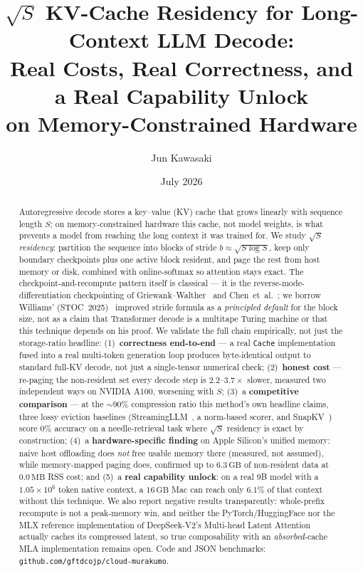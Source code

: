 \documentclass[11pt]{article}
\title{\textbf{$\sqrt{S}$ KV-Cache Residency for Long-Context LLM Decode:\\
Real Costs, Real Correctness, and a Real Capability Unlock\\
on Memory-Constrained Hardware}}
\author[1]{Jun Kawasaki}
\affil[1]{com-junkawasaki / etzhayyim / gftdcojp}
\date{July 2026}
\begin{document}
\maketitle

\begin{abstract}
Autoregressive decode stores a key--value (KV) cache that grows linearly
with sequence length $S$; on memory-constrained hardware this cache, not
model weights, is what prevents a model from reaching the long context it
was trained for. We study \emph{$\sqrt{S}$ residency}: partition the
sequence into blocks of stride $b\approx\sqrt{S\log S}$, keep only boundary
checkpoints plus one active block resident, and page the rest from host
memory or disk, combined with online-softmax so attention stays exact. The
checkpoint-and-recompute pattern itself is classical --- it is the
reverse-mode-differentiation checkpointing of
Griewank--Walther~\cite{griewank2000revolve} and
Chen~et~al.~\cite{chen2016checkpoint}; we borrow Williams'
(STOC~2025)~\cite{williams2025} improved stride formula as a
\emph{principled default} for the block size, not as a claim that
Transformer decode is a multitape Turing machine or that this technique
depends on his proof. We validate the full chain empirically, not just the
storage-ratio headline: (1)~\textbf{correctness end-to-end} --- a real
\texttt{Cache} implementation fused into a real multi-token generation loop
produces byte-identical output to standard full-KV decode, not just a
single-tensor numerical check; (2)~\textbf{honest cost} --- re-paging the
non-resident set every decode step is $2.2$--$3.7\times$ slower, measured
two independent ways on NVIDIA A100, worsening with $S$; (3)~a
\textbf{competitive comparison} --- at the $\sim\!90\%$ compression ratio
this method's own headline claims, three lossy eviction baselines
(StreamingLLM~\cite{xiao2023streamingllm}, a norm-based scorer, and
SnapKV~\cite{li2024snapkv}) score $0\%$ accuracy on a needle-retrieval task
where $\sqrt{S}$ residency is exact by construction; (4)~a
\textbf{hardware-specific finding} on Apple Silicon's unified memory: naive
host offloading does \emph{not} free usable memory there (measured, not
assumed), while memory-mapped paging does, confirmed up to $6.3\,\mathrm{GB}$
of non-resident data at $0.0\,\mathrm{MB}$ RSS cost; and (5)~a
\textbf{real capability unlock}: on a real 9B model with a $1.05\times10^6$
token native context, a $16\,\mathrm{GB}$ Mac can reach only $6.1\%$ of that
context without this technique. We also report negative results
transparently: whole-prefix recompute is not a peak-memory win, and neither
the PyTorch/HuggingFace nor the MLX reference implementation of DeepSeek-V2's
Multi-head Latent Attention~\cite{deepseekv2} actually caches its compressed
latent, so true composability with an \emph{absorbed}-cache MLA
implementation remains open. Code and JSON benchmarks:
\texttt{github.com/gftdcojp/cloud-murakumo}.
\end{abstract}
\end{document}
